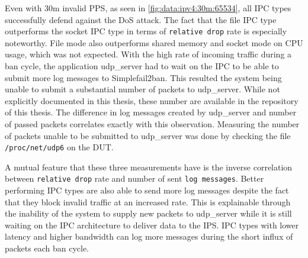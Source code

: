 Even with 30m invalid PPS, as seen in \ref{fig:data:ipv4:30m:65534}, all IPC types successfully defend against the DoS attack.
The fact that the file IPC type outperforms the socket IPC type in terms of \texttt{relative drop} rate is especially noteworthy.
File mode also outperforms shared memory and socket mode on CPU usage, which was not expected.
With the high rate of incoming traffic during a ban cycle, the application udp\_server had to wait on the IPC to be able to submit more log messages to Simplefail2ban.
This resulted the system being unable to submit a substantial number of packets to udp\_server.
While not explicitly documented in this thesis, these number are available in the repository\cite{git:repoOfThesis} of this thesis.
The difference in log messages created by udp\_server and number of passed packets correlates exactly with this observation.
Measuring the number of packets unable to be submitted to udp\_server was done by checking the file \texttt{/proc/net/udp6} on the DUT.

A mutual feature that these three measurements have is the inverse correlation between \texttt{relative drop} rate and number of sent \texttt{log messages}.
Better performing IPC types are also able to send more log messages despite the fact that they block invalid traffic at an increased rate.
This is explainable through the inability of the system to supply new packets to udp\_server while it is still waiting on the IPC architecture to deliver data to the IPS.
IPC types with lower latency and higher bandwidth can log more messages during the short influx of packets each ban cycle.

